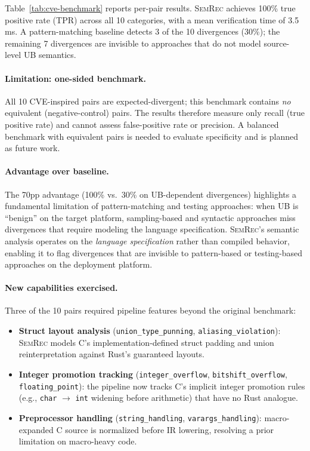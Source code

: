 \documentclass[10pt,a4paper]{article}
\begin{document}
Table~\ref{tab:cve-benchmark} reports per-pair results.
\textsc{SemRec} achieves 100\% true positive rate (TPR) across all 10 categories, with a mean
verification time of 3.5\,ms.  A pattern-matching baseline detects
3 of the 10 divergences (30\%); the remaining 7 divergences are
invisible to approaches that do not model source-level UB semantics.

\paragraph{Limitation: one-sided benchmark.}
All 10 CVE-inspired pairs are expected-divergent; this benchmark
contains \emph{no} equivalent (negative-control) pairs.  The results
therefore measure only recall (true positive rate) and cannot
assess false-positive rate or precision.  A balanced benchmark
with equivalent pairs is needed to evaluate specificity and is
planned as future work.

\paragraph{Advantage over baseline.}
The 70pp advantage (100\% vs.\ 30\% on UB-dependent divergences)
highlights a fundamental limitation of pattern-matching and testing
approaches: when UB is
``benign'' on the target platform, sampling-based and syntactic
approaches miss divergences that require modeling the language
specification.
\textsc{SemRec}'s semantic analysis operates on the \emph{language
specification} rather than compiled behavior, enabling it to flag
divergences that are invisible to pattern-based or testing-based
approaches on the deployment platform.

\paragraph{New capabilities exercised.}
Three of the 10 pairs required pipeline features beyond the original
benchmark:
\begin{itemize}[nosep]
  \item \textbf{Struct layout analysis} (\texttt{union\_type\_punning},
    \texttt{aliasing\_violation}): \textsc{SemRec} models C's
    implementation-defined struct padding and union reinterpretation
    against Rust's guaranteed layouts.
  \item \textbf{Integer promotion tracking} (\texttt{integer\_overflow},
    \texttt{bitshift\_overflow}, \texttt{floating\_point}): the pipeline now tracks
    C's implicit integer promotion rules (e.g., \texttt{char}
    $\to$ \texttt{int} widening before arithmetic) that have no Rust
    analogue.
  \item \textbf{Preprocessor handling} (\texttt{string\_handling},
    \texttt{varargs\_handling}): macro-expanded C source is normalized
    before IR lowering, resolving a prior limitation on macro-heavy
    code.
\end{itemize}
\end{document}
